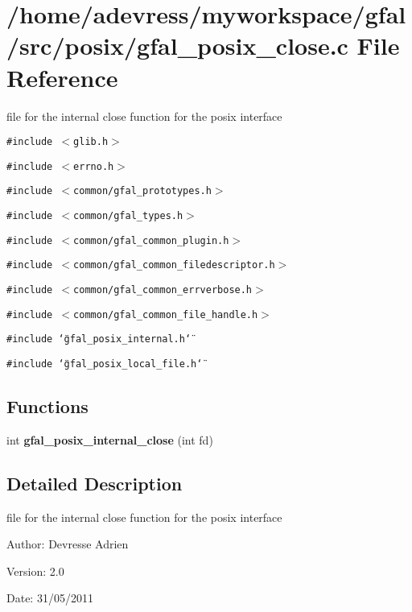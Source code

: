 \section{/home/adevress/myworkspace/gfal/src/posix/gfal\_\-posix\_\-close.c File Reference}
\label{gfal__posix__close_8c}
file for the internal close function for the posix interface 

{\tt \#include $<$glib.h$>$}\par
{\tt \#include $<$errno.h$>$}\par
{\tt \#include $<$common/gfal\_\-prototypes.h$>$}\par
{\tt \#include $<$common/gfal\_\-types.h$>$}\par
{\tt \#include $<$common/gfal\_\-common\_\-plugin.h$>$}\par
{\tt \#include $<$common/gfal\_\-common\_\-filedescriptor.h$>$}\par
{\tt \#include $<$common/gfal\_\-common\_\-errverbose.h$>$}\par
{\tt \#include $<$common/gfal\_\-common\_\-file\_\-handle.h$>$}\par
{\tt \#include \char`\"{}gfal\_\-posix\_\-internal.h\char`\"{}}\par
{\tt \#include \char`\"{}gfal\_\-posix\_\-local\_\-file.h\char`\"{}}\par
\subsection*{Functions}
\begin{CompactItemize}
\item 
int \textbf{gfal\_\-posix\_\-internal\_\-close} (int fd)\label{gfal__posix__close_8c_9cfa5dfe3dff862999ce8f5c5b62a0c4}

\end{CompactItemize}


\subsection{Detailed Description}
file for the internal close function for the posix interface 

\begin{Desc}
\item[Author:]Devresse Adrien \end{Desc}
\begin{Desc}
\item[Version:]2.0 \end{Desc}
\begin{Desc}
\item[Date:]31/05/2011 \end{Desc}
